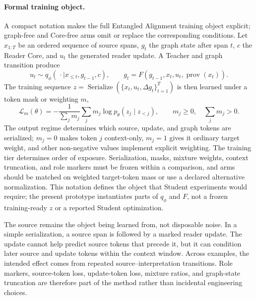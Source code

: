 \documentclass[11pt]{article}
\begin{document}
\begin{samepage}
\paragraph{Formal training object.}\label{sec:cmp-formalization}
A compact notation makes the full Entangled Alignment training object explicit;
graph-free and Core-free arms omit or replace the corresponding conditions. Let
$x_{1:T}$ be an ordered sequence of source spans, $g_t$ the graph state after
span $t$, $c$ the Reader Core, and $u_t$ the generated reader update. A Teacher
and graph transition produce
\[
u_t \sim q_\phi(\,\cdot\mid x_{\leq t},g_{t-1},c), \qquad
g_t=F\!\left(g_{t-1},x_t,u_t,\operatorname{prov}(x_t)\right).
\]
The training sequence $z=\operatorname{Serialize}(\{x_t,u_t,\Delta
g_t\}_{t=1}^T)$ is then learned under a token mask or weighting $m$,
\[
\mathcal{L}_m(\theta)
=-\frac{1}{\sum_j m_j}\sum_j m_j\log p_\theta(z_j\mid z_{<j}),
\qquad m_j\geq 0,\quad \sum_j m_j>0.
\]
The output regime determines which source, update, and graph tokens are
serialized; $m_j=0$ makes token $j$ context-only, $m_j=1$ gives it ordinary
target weight, and other non-negative values implement explicit weighting. The
training tier determines order of exposure. Serialization, masks, mixture
weights, context truncation, and role markers must be frozen within a
comparison, and arms should be matched on weighted target-token mass or use a
declared alternative normalization. This notation defines the object that
Student experiments would require; the present prototype instantiates parts of
$q_\phi$ and $F$, not a frozen training-ready $z$ or a reported Student
optimization.
\end{samepage}

The source remains the object being learned from, not disposable noise. In a
simple serialization, a source span is followed by a marked reader update. The
update cannot help predict source tokens that precede it, but it can condition
later source and update tokens within the context window. Across examples, the
intended effect comes from repeated source--interpretation transitions. Role
markers, source-token loss, update-token loss, mixture ratios, and graph-state
truncation are therefore part of the method rather than incidental engineering
choices.
\end{document}
